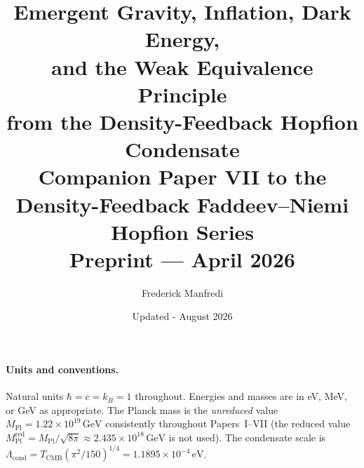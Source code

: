 \documentclass[11pt,a4paper]{article}
\title{\textbf{Emergent Gravity, Inflation, Dark Energy,\\
and the Weak Equivalence Principle\\
from the Density-Feedback Hopfion Condensate}
\\[0.6em]
{\large Companion Paper VII to the Density-Feedback
Faddeev--Niemi Hopfion Series}
\\[0.6em]
\large Preprint --- April 2026}
\author{Frederick Manfredi}
\date{Updated - August 2026}
\theoremstyle{definition}
\theoremstyle{remark}
\newcommand{\TCMB}{T_{\mathrm{CMB}}}
\newcommand{\Lcond}{\Lambda_{\mathrm{cond}}}
\newcommand{\MPl}{M_{\mathrm{Pl}}}
\begin{document}
\maketitle

\paragraph*{Units and conventions.}
Natural units $\hbar = c = k_B = 1$ throughout.
Energies and masses are in eV, MeV, or GeV as appropriate.
The Planck mass is the \emph{unreduced} value
$\MPl = 1.22\times10^{19}\,\mathrm{GeV}$ consistently throughout
Papers~I--VII (the reduced value $\MPl^{\mathrm{red}} = \MPl/\sqrt{8\pi}
\approx 2.435\times10^{18}\,\mathrm{GeV}$ is not used).
The condensate scale is $\Lcond = \TCMB(\pi^2/150)^{1/4} = 1.1895\times10^{-4}\,\mathrm{eV}$.
\end{document}
